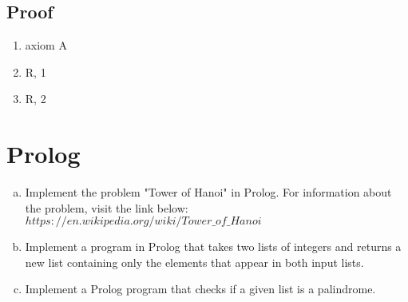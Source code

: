 \documentclass[11pt]{article}
\begin{document}
\subsection{Proof}
\begin{enumerate}
    \item \makebox[7em][l]{${\star}{\diamond}{\star}{\star}{\circ}{\star}{\star}{\star}{\star}{\star}$} axiom A
    \item \makebox[7em][l]{${\star}{\diamond}{\star}{\star}{\star}{\circ}{\star}{\star}{\star}{\star}{\star}{\star}$} R, 1
    \item \makebox[7em][l]{${\star}{\diamond}{\star}{\star}{\star}{\star}{\circ}{\star}{\star}{\star}{\star}{\star}{\star}{\star}$} R, 2
\end{enumerate}

\section{Prolog}

\begin{enumerate}[(a)]

    \item Implement the problem "Tower of Hanoi" in Prolog. For information about the problem, visit the link below:
          ${https://en.wikipedia.org/wiki/Tower\_of\_Hanoi}$

    \item Implement a program in Prolog that takes two lists of integers and returns a new list containing only the elements that appear in both input lists.

    \item Implement a Prolog program that checks if a given list is a palindrome.

\end{enumerate}
\end{document}
